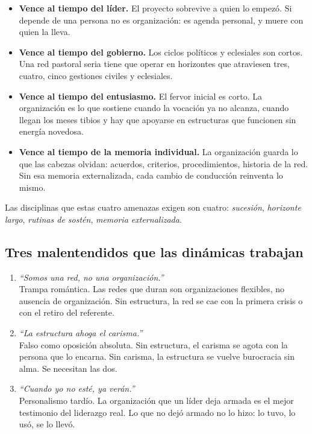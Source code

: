 \documentclass[11pt, a4paper]{article}
\begin{document}
\begin{itemize}
  \item \textbf{Vence al tiempo del líder.} El proyecto sobrevive a quien lo empezó. Si depende de una persona no es organización: es agenda personal, y muere con quien la lleva.
  \item \textbf{Vence al tiempo del gobierno.} Los ciclos políticos y eclesiales son cortos. Una red pastoral seria tiene que operar en horizontes que atraviesen tres, cuatro, cinco gestiones civiles y eclesiales.
  \item \textbf{Vence al tiempo del entusiasmo.} El fervor inicial es corto. La organización es lo que sostiene cuando la vocación ya no alcanza, cuando llegan los meses tibios y hay que apoyarse en estructuras que funcionen sin energía novedosa.
  \item \textbf{Vence al tiempo de la memoria individual.} La organización guarda lo que las cabezas olvidan: acuerdos, criterios, procedimientos, historia de la red. Sin esa memoria externalizada, cada cambio de conducción reinventa lo mismo.
\end{itemize}

Las disciplinas que estas cuatro amenazas exigen son cuatro: \emph{sucesión}, \emph{horizonte largo}, \emph{rutinas de sostén}, \emph{memoria externalizada}.

\subsection*{Tres malentendidos que las dinámicas trabajan}

\begin{enumerate}[label={\color{organizacionVerde}\arabic*.}]
  \item \emph{``Somos una red, no una organización.''} \\
        Trampa romántica. Las redes que duran son organizaciones flexibles, no ausencia de organización. Sin estructura, la red se cae con la primera crisis o con el retiro del referente.
  \item \emph{``La estructura ahoga el carisma.''} \\
        Falso como oposición absoluta. Sin estructura, el carisma se agota con la persona que lo encarna. Sin carisma, la estructura se vuelve burocracia sin alma. Se necesitan las dos.
  \item \emph{``Cuando yo no esté, ya verán.''} \\
        Personalismo tardío. La organización que un líder deja armada es el mejor testimonio del liderazgo real. Lo que no dejó armado no lo hizo: lo tuvo, lo usó, se lo llevó.
\end{enumerate}
\end{document}
